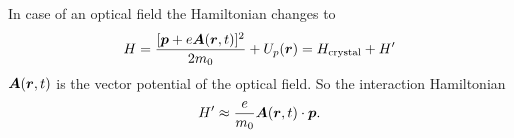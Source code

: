 In case of an optical field the Hamiltonian changes to
\begin{equation*}
	H = \frac{[\mbox{\boldmath $p$} + e \mbox{\boldmath $A$}(\mbox{\boldmath $r$}, t)]^2}{2 m_0} + U_p(\mbox{\boldmath $r$}) = H_\text{crystal} + H'
\end{equation*}
$\mbox{\boldmath $A$}(\mbox{\boldmath $r$},t)$ is the vector potential of the optical field. So the interaction Hamiltonian 
\begin{equation*}
	H' \approx \frac{e}{m_0} \mbox{\boldmath $A$}(\mbox{\boldmath $r$},t) \cdot \mbox{\boldmath $p$}.
\end{equation*}